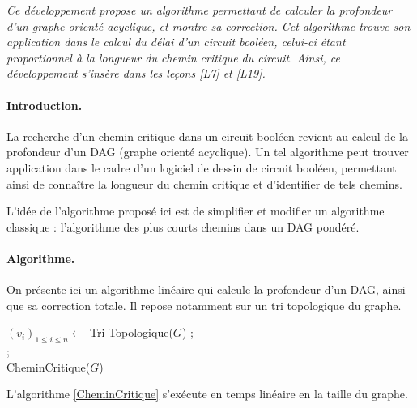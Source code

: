 
\textit{
Ce développement propose un algorithme permettant de calculer la profondeur d'un graphe orienté acyclique, et montre sa correction. Cet algorithme trouve son application dans le calcul du délai d'un circuit booléen, celui-ci étant proportionnel à la longueur du chemin critique du circuit. Ainsi, ce développement s'insère dans les leçons   \ref{L7} et \ref{L19}.
}

\paragraph{Introduction.} La recherche d'un chemin critique dans un circuit booléen revient au calcul de la profondeur d'un DAG (graphe orienté acyclique). Un tel algorithme peut trouver application dans le cadre d'un logiciel de dessin de circuit booléen, permettant ainsi de connaître la longueur du chemin critique et d'identifier de tels chemins.


L'idée de l'algorithme proposé ici est de simplifier et modifier un algorithme classique : l'algorithme des plus courts chemins dans un DAG pondéré.


\paragraph{Algorithme.} On présente ici un algorithme linéaire qui calcule la profondeur d'un DAG, ainsi que sa correction totale. Il repose notamment sur un tri topologique du graphe.


\begin{algorithm}
$(v_i)_{1\leq i \leq n} \leftarrow$ Tri-Topologique($G$) ;\\

 ;\\
\caption{CheminCritique($G$)}\label{CheminCritique}
\end{algorithm}


\begin{proposition}
L'algorithme \ref{CheminCritique} s'exécute en temps linéaire en la taille du graphe.
\end{proposition}


